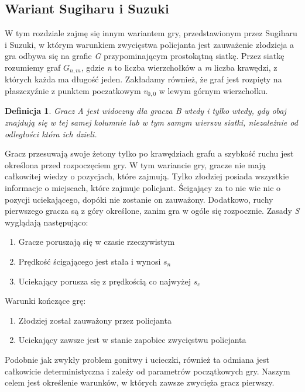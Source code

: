 \documentclass[brudnopis]{xmgr}
\newtheorem{Definicja}{Definicja}
\begin{document}
\subsection{Wariant Sugiharu i Suzuki}
W tym rozdziale zajmę się innym wariantem gry, przedstawionym przez Sugiharu i Suzuki, w którym warunkiem zwycięstwa policjanta jest zauważenie złodzieja a gra odbywa się na grafie \textit{G} przypominającym prostokątną siatkę.
Przez siatkę rozumiemy graf \textit{$G_{n,m}$}, gdzie \textit{n} to liczba wierzchołków a \textit{m} liczba krawędzi, z których każda ma długość jeden. Zakładamy również, że graf jest rozpięty na płaszczyźnie z punktem poczatkowym \textit{$v_{0,0}$} w lewym górnym wierzchołku.
\begin{Definicja}
  Gracz A \textnormal{jest widoczny} dla gracza B wtedy i tylko wtedy, gdy obaj znajdują się w tej samej kolumnie lub w tym samym wierszu siatki, niezależnie od odległości która ich dzieli.
\end{Definicja}

Gracz przesuwają swoje żetony tylko po krawędziach grafu a szybkość ruchu jest określona przed rozpoczęciem gry.
W tym wariancie gry, gracze nie mają całkowitej wiedzy o pozycjach, które zajmują. Tylko złodziej posiada wszystkie informacje o miejscach, które zajmuje policjant. Ścigający za to nie wie nic o pozycji uciekającego, dopóki nie zostanie on zauważony. Dodatkowo, ruchy pierwszego gracza są z góry określone, zanim gra w ogóle się rozpocznie.
Zasady \textit{S} wyglądają następująco:
\begin{enumerate}
  \item Gracze poruszają się w czasie rzeczywistym
  \item Prędkość ścigającego jest stała i wynosi $s_n$
  \item Uciekający porusza się z prędkością co najwyżej $s_c$
\end{enumerate}

Warunki kończące grę:
\begin{enumerate}
  \item Złodziej został zauważony przez policjanta
  \item Uciekający zawsze jest w stanie zapobiec zwycięstwu policjanta
\end{enumerate}

Podobnie jak zwykły problem gonitwy i ucieczki, również ta odmiana jest całkowicie deterministyczna i zależy od parametrów początkowych gry. Naszym celem jest określenie warunków, w których zawsze zwycięża gracz pierwszy. 
\end{document}

